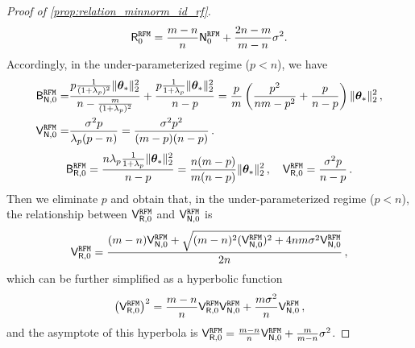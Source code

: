 \begin{proof}[Proof of \cref{prop:relation_minnorm_id_rf}]
\[
\begin{aligned}
\mathsf R_{0}^{\tt RFM} = \frac{m-n}{n} \mathsf N_{0}^{\tt RFM} +\frac{2n-m}{m-n} \sigma^2.
\end{aligned}
\]
Accordingly, in the under-parameterized regime ($p<n$), we have
\[
\begin{aligned}
     \mathsf B^{\tt RFM}_{\mathsf N,0} =& \frac{p\frac{1}{(1+\lambda_p)^2}\|{\boldsymbol \theta}_*\|_2^2}{n - \frac{m}{(1+\lambda_p)^2}} + \frac{p\frac{1}{1+\lambda_p}\|{\boldsymbol \theta}_*\|_2^2}{n-p} = \frac{p}{m} \left( \frac{p^2}{nm - p^2} + \frac{p}{n-p} \right) \|{\boldsymbol \theta}_*\|_2^2\,,\\
    \mathsf V^{\tt RFM}_{\mathsf N,0} =& \frac{\sigma^2p}{\lambda_p(p-n)} = \frac{\sigma^2p^2}{(m-p)(n-p)}\,.
\end{aligned}
\]
\[
\begin{aligned}
     \mathsf B^{\tt RFM}_{\mathsf R,0} = \frac{n\lambda_p \frac{1}{1+\lambda_p}\|{\boldsymbol \theta}_*\|_2^2}{n-p} = \frac{n(m-p)}{m(n-p)} \|{\boldsymbol \theta}_*\|_2^2\,,\quad \mathsf V^{\tt RFM}_{\mathsf R,0} = \frac{\sigma^2p}{n-p}\,.
\end{aligned}
\]
Then we eliminate $p$ and obtain that, in the under-parameterized regime ($p<n$), the relationship between $\mathsf V^{\tt RFM}_{\mathsf R,0}$ and $\mathsf V^{\tt RFM}_{\mathsf N,0}$ is
\[
\begin{aligned}
\mathsf V^{\tt RFM}_{\mathsf R,0} = \frac{(m-n) \mathsf V^{\tt RFM}_{\mathsf N,0} + \sqrt{(m-n)^2(\mathsf V^{\tt RFM}_{\mathsf N,0})^2 + 4nm\sigma^2\mathsf V^{\tt RFM}_{\mathsf N,0}}}{2n}\,,
\end{aligned}
\]
which can be further simplified as a hyperbolic function
\begin{equation*}
     \left(\mathsf V^{\tt RFM}_{\mathsf R,0} \right)^2 = \frac{m-n}{n} \mathsf V^{\tt RFM}_{\mathsf R,0} \mathsf V^{\tt RFM}_{\mathsf N,0} + \frac{m \sigma^2}{n} \mathsf V^{\tt RFM}_{\mathsf N,0}\,,
\end{equation*}
and the asymptote of this hyperbola is $\mathsf V^{\tt RFM}_{\mathsf R,0} = \frac{m-n}{n}\mathsf V^{\tt RFM}_{\mathsf N,0} + \frac{m}{m-n} \sigma^2$.


\end{proof}
